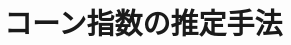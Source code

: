 \documentclass[../main]{subfiles}
\begin{document}
\section{コーン指数の推定手法}
\label{sec:pmethod_estimation}
\end{document}
